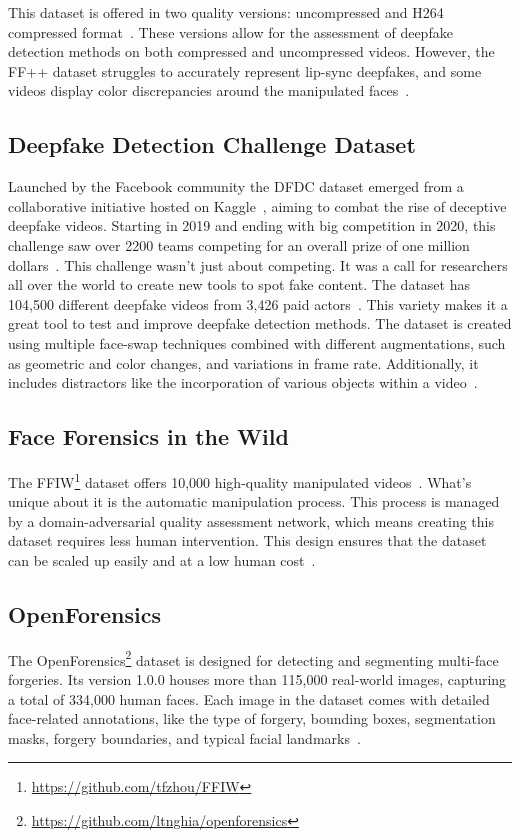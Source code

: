 This dataset is offered in two quality versions: uncompressed and H264~\cite{enwiki:1168205077}
compressed format~\cite{deepfake-dataset}. These versions allow for the assessment of
deepfake detection methods on both compressed and uncompressed videos. However, the \ac{FF++}
dataset struggles to accurately represent lip-sync deepfakes, and some videos display
color discrepancies around the manipulated faces~\cite{deepfake-dataset}.

\subsection{Deepfake Detection Challenge Dataset}
Launched by the Facebook community the \ac{DFDC} dataset emerged from a collaborative initiative
hosted on Kaggle~\cite{kaggle2020}, aiming to combat the rise of deceptive deepfake
videos. Starting in 2019 and ending with big competition in 2020, this challenge saw
over 2200 teams competing for an overall prize of one million dollars~\cite{masters-thesis}.
This challenge wasn't just about competing. It was a call for researchers all over the world to create new tools to spot fake
content. The dataset has 104,500 different deepfake videos from 3,426 paid
actors~\cite{dolhansky2020deepfake,masters-thesis}. This variety makes it a great tool to test
and improve deepfake detection methods. The dataset is created using multiple face-swap
techniques combined with different augmentations, such as geometric and color changes,
and variations in frame rate. Additionally, it includes distractors like the incorporation
of various objects within a video~\cite{deepfake-dataset}.

\subsection{Face Forensics in the Wild}
The \ac{FFIW}\footnote{\url{https://github.com/tfzhou/FFIW}} dataset offers 10,000 high-quality
manipulated videos~\cite{Zhou_2021_CVPR}. What's unique about it is the automatic manipulation
process. This process is managed by a domain-adversarial quality assessment network, which
means creating this dataset requires less human intervention. This design ensures that the
dataset can be scaled up easily and at a low human cost~\cite{Zhou_2021_CVPR}.

\subsection{OpenForensics}
The OpenForensics\footnote{\url{https://github.com/ltnghia/openforensics}} dataset is
designed for detecting and segmenting multi-face forgeries.
Its version 1.0.0 houses more than 115,000 real-world images, capturing a total of 334,000 human faces.
Each image in the dataset comes with detailed face-related annotations, like the type
of forgery, bounding boxes, segmentation masks, forgery boundaries, and typical facial
landmarks~\cite{ltnghia-ICCV2021}.


